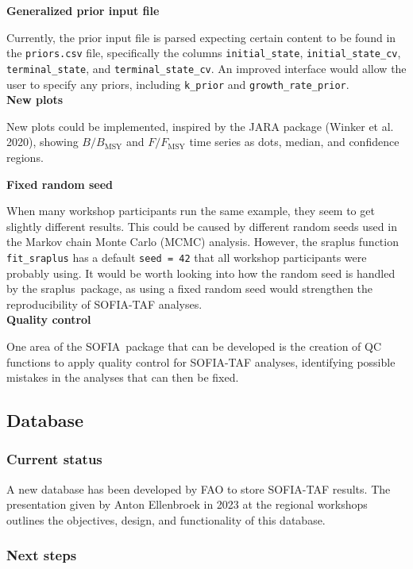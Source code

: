 \documentclass[12pt]{article}
\newcommand\SOFIA{{\sf SOFIA}}
\newcommand\sraplus{{\sf sraplus}}
\begin{document}
\textbf{Generalized prior input file}

Currently, the prior input file is parsed expecting certain content to be found
in the \verb|priors.csv| file, specifically the columns \verb|initial_state|,
\verb|initial_state_cv|, \verb|terminal_state|, and \verb|terminal_state_cv|. An
improved interface would allow the user to specify any priors, including
\verb|k_prior| and \verb|growth_rate_prior|.\\[-2ex]

\textbf{New plots}

New plots could be implemented, inspired by the JARA package (Winker et al.
2020), showing $B/B_\mathrm{MSY}$ and $F/F_\mathrm{MSY}$ time series as dots,
median, and confidence regions.\\[-2ex]

\newpage

\textbf{Fixed random seed}

When many workshop participants run the same example, they seem to get slightly
different results. This could be caused by different random seeds used in the
Markov chain Monte Carlo (MCMC) analysis. However, the sraplus function
\verb|fit_sraplus| has a default \verb|seed = 42| that all workshop participants
were probably using. It would be worth looking into how the random seed is
handled by the \sraplus\ package, as using a fixed random seed would strengthen
the reproducibility of SOFIA-TAF analyses.\\[-2ex]

\textbf{Quality control}

One area of the \SOFIA\ package that can be developed is the creation of QC
functions to apply quality control for SOFIA-TAF analyses, identifying possible
mistakes in the analyses that can then be fixed.

\subsection{Database}

\subsubsection{Current status}

A new database has been developed by FAO to store SOFIA-TAF results. The
presentation given by Anton Ellenbroek in 2023 at the regional workshops
outlines the objectives, design, and functionality of this database.

\subsubsection{Next steps}
\end{document}
